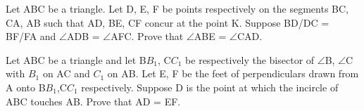 \item Let ABC be a triangle. Let D, E, F be points respectively on the segments BC, CA, AB such that AD, BE, CF concur at the point K. Suppose BD/DC = BF/FA and $\angle$ADB = $\angle$AFC. Prove that $\angle$ABE = $\angle$CAD.

\item Let ABC be a triangle and let B$B_1$, C$C_1$ be respectively the bisector of $\angle$B, $\angle$C with $B_1$ on AC and $C_1$ on AB. Let E, F be the feet of perpendiculars drawn from A onto  B$B_1$,C$C_1$ respectively. Suppose D is the point at which the incircle of ABC touches AB. Prove that AD = EF.
